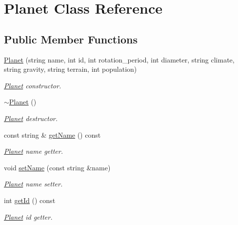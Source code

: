 \hypertarget{class_planet}{}\section{Planet Class Reference}
\label{class_planet}
\subsection*{Public Member Functions}
\begin{DoxyCompactItemize}
\item 
\hyperlink{class_planet_ace7bddda8637e80b71eb5d3af491d5cc}{Planet} (string name, int id, int rotation\+\_\+period, int diameter, string climate, string gravity, string terrain, int population)
\begin{DoxyCompactList}\small\item\em \hyperlink{class_planet}{Planet} constructor. \end{DoxyCompactList}\item 
\mbox{\label{class_planet_aaa1aaed9d4ef90b4836531edb7b18e0a}} 
\hyperlink{class_planet_aaa1aaed9d4ef90b4836531edb7b18e0a}{$\sim$\+Planet} ()
\begin{DoxyCompactList}\small\item\em \hyperlink{class_planet}{Planet} destructor. \end{DoxyCompactList}\item 
const string \& \hyperlink{class_planet_a2734577beb825016099903df6152e1f1}{get\+Name} () const
\begin{DoxyCompactList}\small\item\em \hyperlink{class_planet}{Planet} name getter. \end{DoxyCompactList}\item 
void \hyperlink{class_planet_a8ef9f3f438cb24092e611df2379c457d}{set\+Name} (const string \&name)
\begin{DoxyCompactList}\small\item\em \hyperlink{class_planet}{Planet} name setter. \end{DoxyCompactList}\item 
int \hyperlink{class_planet_a6eefeb72d53a878ba3f7b890c50ecdaa}{get\+Id} () const
\begin{DoxyCompactList}\small\item\em \hyperlink{class_planet}{Planet} id getter. \end{DoxyCompactList}\item 

\end{DoxyCompactItemize}
